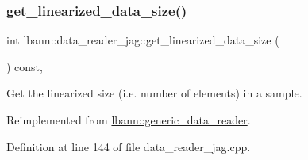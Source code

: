 \subsubsection{\texorpdfstring{get\+\_\+linearized\+\_\+data\+\_\+size()}{get\_linearized\_data\_size()}}
{\footnotesize\ttfamily int lbann\+::data\+\_\+reader\+\_\+jag\+::get\+\_\+linearized\+\_\+data\+\_\+size (\begin{DoxyParamCaption}{ }\end{DoxyParamCaption}) const\hspace{0.3cm}{\ttfamily [override]}, {\ttfamily [virtual]}}



Get the linearized size (i.\+e. number of elements) in a sample. 



Reimplemented from \hyperlink{classlbann_1_1generic__data__reader_a246a719477c8c7b6122d41b6f5618d41}{lbann\+::generic\+\_\+data\+\_\+reader}.



Definition at line 144 of file data\+\_\+reader\+\_\+jag.\+cpp.


